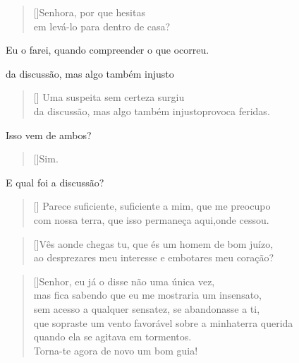 \settowidth{\versewidth}{brilhante? Tenso, agito-me com med}
\begin{verse}[\versewidth]Senhora, por que hesitas\\ 
em levá-lo para dentro de casa?
\end{verse}

   Eu o farei, quando compreender o que ocorreu.



\settowidth{\versewidth}%
{da discussão, mas algo também injusto}
\begin{verse}[\versewidth]
Uma suspeita sem certeza surgiu\\
da discussão, mas algo também injusto\qb provoca feridas.
\end{verse}

   Isso vem de ambos?

\begin{verse}[\versewidth]Sim.\end{verse}

   E qual foi a discussão?



\settowidth{\versewidth}{brilhante? Tenso, agito-me com medo em meu trêmulo}
\begin{verse}[\versewidth]
Parece suficiente, suficiente a mim, que me preocupo\\
com nossa terra, que isso permaneça aqui,\qb onde cessou.
\end{verse}


\settowidth{\versewidth}{brilhante? Tenso, agito-me com medo em meu trêmulo}
\begin{verse}[\versewidth]Vês aonde chegas tu, que és um homem de bom juízo,\\
ao desprezares meu interesse e embotares meu coração?
\end{verse}



\settowidth{\versewidth}{brilhante? Tenso, agito-me com medo em meu trê}
\begin{verse}[\versewidth]Senhor, eu já o disse não uma única vez,\\
mas fica sabendo que eu me mostraria um insensato,\\
sem acesso a qualquer sensatez, se abandonasse a ti,\\
que sopraste um vento favorável sobre a minha\qb terra querida\\
quando ela se agitava em tormentos.\\
Torna-te agora de novo um bom guia!
\end{verse}

